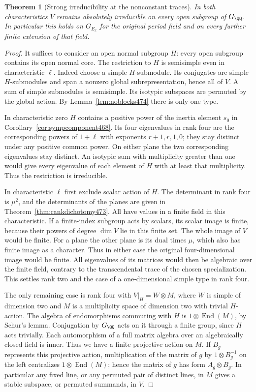 \documentclass[a4paper,11pt]{article}
\newtheorem{theorem}[proposition]{Theorem}
\theoremstyle{definition}
\theoremstyle{remark}
\numberwithin{equation}{section}
\begin{document}
\begin{theorem}[Strong irreducibility at the nonconstant traces]\leavevmode
\label{thm:strongtrace474}
In both characteristics \(V\) remains absolutely irreducible on
every open subgroup of \(G_\QQ\). In particular this holds on
\(G_{E_x}\) for the original period field and on every further
finite extension of that field.
\end{theorem}
\begin{proof}
It suffices to consider an open normal subgroup \(H\): every open
subgroup contains its open normal core. The restriction to \(H\)
is semisimple even in characteristic \(\ell\). Indeed choose a
simple \(H\)-submodule. Its conjugates are simple \(H\)-submodules
and span a nonzero global subrepresentation, hence all of \(V\).
A sum of simple submodules is semisimple. Its isotypic subspaces
are permuted by the global action. By Lemma~\ref{lem:noblocks474}
there is only one type.

In characteristic zero \(H\) contains a positive power of the
inertia element \(s_0\) in Corollary~\ref{cor:sympcomponent468}.
Its four eigenvalues in rank four are the corresponding powers
of \(1+\ell\) with exponents \(r+1,r,1,0\); they stay distinct
under any positive common power. On either plane the two
corresponding eigenvalues stay distinct. An isotypic sum with
multiplicity greater than one would give every eigenvalue of
each element of \(H\) with at least that multiplicity. Thus the
restriction is irreducible.

In characteristic \(\ell\) first exclude scalar action of \(H\).
The determinant in rank four is \(\mu^2\), and the determinants
of the planes are given in Theorem~\ref{thm:rankdichotomy473}.
All have values in a finite field in this characteristic. If a
finite-index subgroup acts by scalars, its scalar image is finite,
because their powers of degree \(\dim V\) lie in this finite set.
The whole image of \(V\) would be finite. For a plane the other
plane is its dual times \(\mu\), which also has finite image as
a character. Thus in either case the original four-dimensional
image would be finite. All eigenvalues of its matrices would
then be algebraic over the finite field, contrary to the
transcendental trace of the chosen specialization. This settles
rank two and the case of a one-dimensional simple type in rank four.

The only remaining case is rank four with \(V|_H=W\otimes M\),
where \(W\) is simple of dimension two and \(M\) is a multiplicity
space of dimension two with trivial \(H\)-action. The algebra
of endomorphisms commuting with \(H\) is
\(1\otimes\operatorname{End}(M)\), by Schur's lemma. Conjugation
by \(G_\QQ\) acts on it through a finite group, since \(H\) acts
trivially. Each automorphism of a full matrix algebra over an
algebraically closed field is inner. Thus we have a finite
projective action on \(M\). If \(B_g\) represents this projective
action, multiplication of the matrix of \(g\) by \(1\otimes B_g^{-1}\)
on the left centralizes \(1\otimes\operatorname{End}(M)\);
hence the matrix of \(g\) has form \(A_g\otimes B_g\).
In particular any fixed line, or any permuted pair of distinct
lines, in \(M\) gives a stable subspace, or permuted summands,
in \(V\).


\end{proof}
\end{document}
